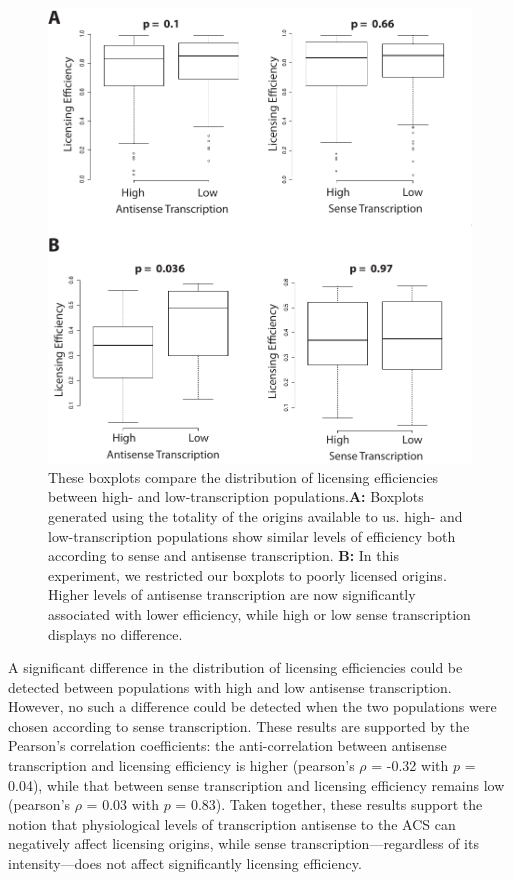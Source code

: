 \begin{figure}[hp!]

\centering
\includegraphics[width=\textwidth]{figures/results/competence}
\caption[boxplots comparing licensing efficiencies in high- and low-transcription populations]{These boxplots compare the distribution of licensing efficiencies between high- and low-transcription populations.\textbf{A: }Boxplots generated using the totality of the origins available to us. high- and low-transcription populations show similar levels of efficiency both according to sense and antisense transcription. \textbf{B: } In this experiment, we restricted our boxplots to poorly licensed origins. Higher levels of antisense transcription are now significantly associated with lower efficiency, while high or low sense transcription displays no difference. }
\label{fig:licensing}

\end{figure}  
A significant difference in the distribution of licensing efficiencies could be detected between populations with high and low antisense transcription. 
However, no such a difference could be detected when the two populations were chosen according to sense transcription. 
These results are supported by the Pearson’s correlation coefficients: the anti-correlation between antisense transcription and licensing efficiency is higher (pearson’s $\rho$ = -0.32 with $p$ = 0.04), while that between sense transcription and licensing efficiency remains low (pearson’s $\rho$ = 0.03 with $p$ = 0.83). 
Taken together, these results support the notion that physiological levels of transcription antisense to the ACS can negatively affect licensing origins, while sense transcription—regardless of its intensity—does not affect significantly licensing efficiency.



